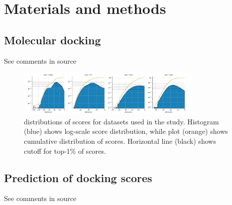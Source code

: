 \section{Materials and methods}

\subsection{Molecular docking}
See comments in source

\begin{figure}[h]
\centering
\includegraphics[width=0.8\textwidth]{figures/Figure_1.png}
\caption{distributions of scores for datasets used in the study. Histogram (blue) shows log-scale score distribution, while plot (orange) shows cumulative distribution of scores. Horizontal line (black) shows cutoff for top-1\% of scores.}
\label{fig:fig_1}
\end{figure}


\subsection{Prediction of docking scores} \label{subsec:prediction}
See comments in source



